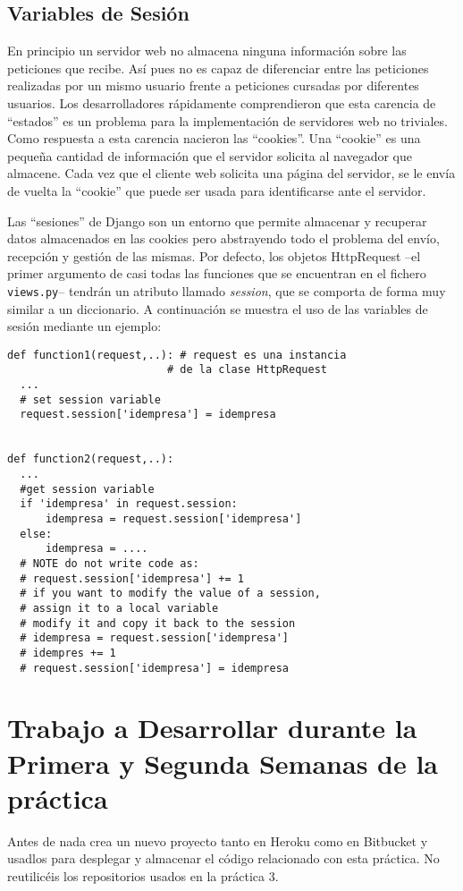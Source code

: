 \documentclass[12pt]{article} %
\newcommand{\views}{\texttt{views.py}}%
\begin{document}
\subsection{Variables de Sesión}

En principio un servidor web no almacena ninguna información sobre las peticiones que recibe.
Así pues no es capaz de diferenciar entre las peticiones realizadas por un mismo usuario frente a peticiones cursadas por diferentes usuarios. Los desarrolladores rápidamente comprendieron que esta carencia de ``estados'' es un problema para la implementación de
servidores web no triviales. Como respuesta a esta carencia nacieron las ``cookies''. Una ``cookie'' es una pequeña cantidad de información que el servidor solicita al navegador que almacene. Cada vez que el cliente web solicita una página del servidor, se le envía de vuelta la ``cookie'' que puede ser usada para identificarse ante el servidor.

Las ``sesiones'' de Django son un entorno que  permite almacenar y recuperar datos  almacenados en las cookies pero abstrayendo todo el problema del envío, recepción y gestión de las mismas. Por defecto, los objetos HttpRequest --el primer argumento de casi todas las funciones que se encuentran en el fichero \views-- tendrán un atributo llamado \textit{session}, que se comporta de forma muy similar a un diccionario. A continuación se muestra el uso de las variables de sesión mediante un ejemplo:

\begin{lstlisting}
def function1(request,..): # request es una instancia 
                         # de la clase HttpRequest
  ...
  # set session variable
  request.session['idempresa'] = idempresa


def function2(request,..): 
  ...
  #get session variable
  if 'idempresa' in request.session:
      idempresa = request.session['idempresa']
  else:
      idempresa = ....
  # NOTE do not write code as:
  # request.session['idempresa'] += 1
  # if you want to modify the value of a session, 
  # assign it to a local variable
  # modify it and copy it back to the session
  # idempresa = request.session['idempresa']
  # idempres += 1
  # request.session['idempresa'] = idempresa
\end{lstlisting}


\section{Trabajo a Desarrollar durante la Primera y Segunda Semanas de la práctica}
Antes de nada crea un nuevo proyecto tanto en Heroku como en Bitbucket y usadlos para desplegar y almacenar el código relacionado con esta práctica. No reutilicéis los repositorios usados en la práctica 3.
\end{document}
